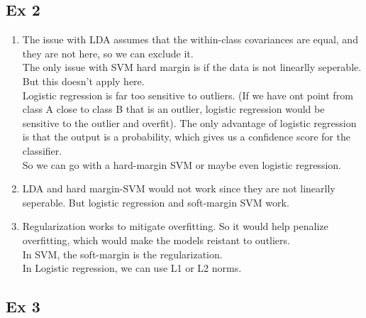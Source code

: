 \documentclass[12pt]{article}
\begin{document}
\subsection*{Ex 2}

\begin{enumerate}[label = \letters]
    \item 
    The issue with LDA assumes that the within-class
    covariances are equal, and they are not here,
    so we can exclude it. \\
    The only issue with SVM hard margin is if the
    data is not linearlly seperable. But this doesn't
    apply here. \\
    Logistic regression is far too sensitive to outliers.
    (If we have ont point from class A close to class B
    that is an outlier, logistic regression
    would be sensitive to the outlier and overfit). 
    The only advantage of logistic regression is that the
    output is a probability, which gives us
    a confidence score for the classifier. \\
    So we can go with a hard-margin SVM
    or maybe even logistic regression. \\ 
    \item 
    LDA and hard margin-SVM would not work since they
    are not linearlly seperable. But logistic regression
    and soft-margin SVM work.
    \item 
    Regularization works to mitigate overfitting.
    So it would help penalize overfitting,
    which would make the models reistant to outliers. \\
    In SVM, the soft-margin is the regularization. \\
    In Logistic regression, we can use L1 or L2 norms.
\end{enumerate}


\newpage

\subsection*{Ex 3}
\end{document}
